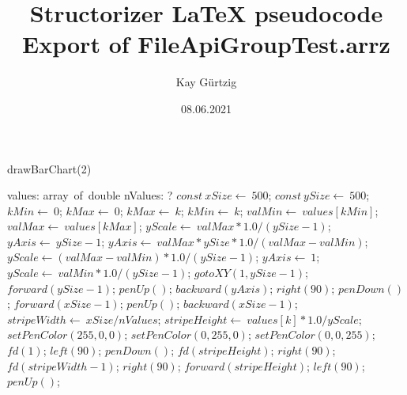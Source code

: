 \documentclass[a4paper,10pt]{article}
\title{Structorizer LaTeX pseudocode Export of FileApiGroupTest.arrz}
\author{Kay Gürtzig}
\date{08.06.2021}
\begin{document}
\begin{algorithm}
\caption{drawBarChart(2)}
\begin{algorithmic}[5]
\State {}
\State {}
\State {}
\State {}
    \State values: array\ of\ double
    \State nValues: ?
  \EndDecl
  \State \(const\ xSize\gets\ 500\);
  \State \(const\ ySize\gets\ 500\);
  \State \(kMin\gets\ 0\);
  \State \(kMax\gets\ 0\);
      \State \(kMax\gets\ k\);
    \Else
        \State \(kMin\gets\ k\);
      \EndIf
    \EndIf
  \EndFor
  \State \(valMin\gets\ values[kMin]\);
  \State \(valMax\gets\ values[kMax]\);
  \State \(yScale\gets\ valMax*1.0/(ySize-1)\);
  \State \(yAxis\gets\ ySize-1\);
      \State \(yAxis\gets\ valMax*ySize*1.0/(valMax-valMin)\);
      \State \(yScale\gets(valMax-valMin)*1.0/(ySize-1)\);
    \Else
      \State \(yAxis\gets\ 1\);
      \State \(yScale\gets\ valMin*1.0/(ySize-1)\);
    \EndIf
  \EndIf
  \State \(gotoXY(1,ySize-1)\);
  \State \(forward(ySize-1)\);
  \State \(penUp()\);
  \State \(backward(yAxis)\);
  \State \(right(90)\);
  \State \(penDown()\);
  \State \(forward(xSize-1)\);
  \State \(penUp()\);
  \State \(backward(xSize-1)\);
  \State \(stripeWidth\gets\ xSize/nValues\);
    \State \(stripeHeight\gets\ values[k]*1.0/yScale\);
        \State \(setPenColor(255,0,0)\);
      \EndSelector
        \State \(setPenColor(0,255,0)\);
      \EndSelector
        \State \(setPenColor(0,0,255)\);
      \EndSelector
    \EndCase
    \State \(fd(1)\);
    \State \(left(90)\);
    \State \(penDown()\);
    \State \(fd(stripeHeight)\);
    \State \(right(90)\);
    \State \(fd(stripeWidth-1)\);
    \State \(right(90)\);
    \State \(forward(stripeHeight)\);
    \State \(left(90)\);
    \State \(penUp()\);
  \EndFor
\EndProcedure
\end{algorithmic}
\end{algorithm}
\end{document}
